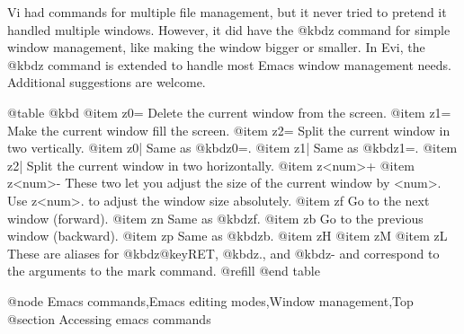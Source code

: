 Vi had commands for multiple file management, but it never tried to
pretend it handled multiple windows.  However, it did have the @kbd{z}
command for simple window management, like making the window bigger or
smaller.  In Evi, the @kbd{z} command is extended to handle most Emacs
window management needs.  Additional suggestions are welcome.

@table @kbd
@item z0=
Delete the current window from the screen.
@item z1=
Make the current window fill the screen.
@item z2=
Split the current window in two vertically.
@item z0|
Same as @kbd{z0=}.
@item z1|
Same as @kbd{z1=}.
@item z2|
Split the current window in two horizontally.
@item z<num>+
@item z<num>-
These two let you adjust the size of the current window by <num>.
Use z<num>. to adjust the window size absolutely.
@item zf
Go to the next window (forward).
@item zn
Same as @kbd{zf}.
@item zb
Go to the previous window (backward).
@item zp
Same as @kbd{zb}.
@item zH
@item zM
@item zL
These are aliases for @kbd{z@key{RET}}, @kbd{z.}, and @kbd{z-} and correspond
to the arguments to the mark command. @refill
@end table

@node Emacs commands,Emacs editing modes,Window management,Top
@section Accessing emacs commands

